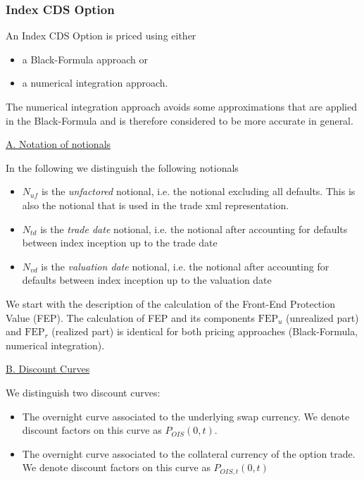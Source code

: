 \subsubsection{Index CDS Option}
\label{pricing:cr_indexcdsoption}

An Index CDS Option is priced using either

\begin{itemize}
\item a Black-Formula approach or
\item a numerical integration approach.
\end{itemize}

The numerical integration approach avoids some approximations that are applied in the Black-Formula and is therefore
considered to be more accurate in general.

\underline{A. Notation of notionals}

In the following we distinguish the following notionals

\begin{itemize}
\item $N_{uf}$ is the {\em unfactored} notional, i.e. the notional excluding all defaults. This is also the notional
  that is used in the trade xml representation.
\item $N_{td}$ is the {\em trade date} notional, i.e. the notional after accounting for defaults between index inception up to
  the trade date
\item $N_{vd}$ is the {\em valuation date} notional, i.e. the notional after accounting for defaults between index
  inception up to the valuation date
\end{itemize}

We start with the description of the calculation of the Front-End Protection Value (FEP). The calculation of FEP and its
components $\text{FEP}_u$ (unrealized part) and $\text{FEP}_r$ (realized part) is identical for both pricing approaches
(Black-Formula, numerical integration).

\underline{B. Discount Curves}

We distinguish two discount curves:

\begin{itemize}
\item The overnight curve associated to the underlying swap currency. We denote discount factors on this curve as
  $P_{OIS}(0,t)$.
\item The overnight curve associated to the collateral currency of the option trade. We denote discount factors on this
  curve as $P_{OIS,t}(0,t)$
\end{itemize}


